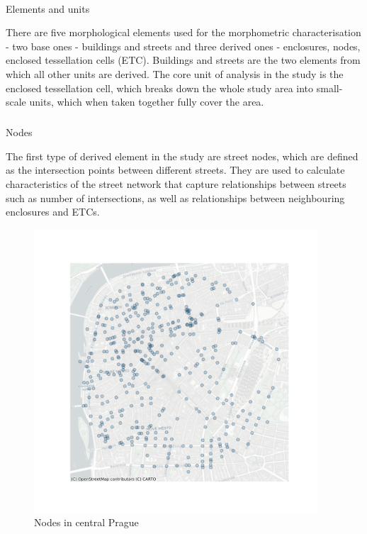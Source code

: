 \documentclass[
  letterpaper,
  DIV=11,
  numbers=noendperiod]{scrartcl}
\makeatletter
\let\oldparagraph\paragraph
\renewcommand{\paragraph}{
    \@ifstar
      \xxxParagraphStar
      \xxxParagraphNoStar
  }
\newcommand{\xxxParagraphStar}[1]{\oldparagraph*{#1}\mbox{}}
\newcommand{\xxxParagraphNoStar}[1]{\oldparagraph{#1}\mbox{}}
\let\oldsubparagraph\subparagraph
\renewcommand{\subparagraph}{
    \@ifstar
      \xxxSubParagraphStar
      \xxxSubParagraphNoStar
  }
\newcommand{\xxxSubParagraphStar}[1]{\oldsubparagraph*{#1}\mbox{}}
\newcommand{\xxxSubParagraphNoStar}[1]{\oldsubparagraph{#1}\mbox{}}
\makeatother
\begin{document}
\paragraph{Elements and units}\label{elements-and-units}

There are five morphological elements used for the morphometric
characterisation - two base ones - buildings and streets and three
derived ones - enclosures, nodes, enclosed tessellation cells (ETC).
Buildings and streets are the two elements from which all other units
are derived. The core unit of analysis in the study is the enclosed
tessellation cell, which breaks down the whole study area into
small-scale units, which when taken together fully cover the area.

\subparagraph{Nodes}\label{nodes}

The first type of derived element in the study are street nodes, which
are defined as the intersection points between different streets. They
are used to calculate characteristics of the street network that capture
relationships between streets such as number of intersections, as well
as relationships between neighbouring enclosures and ETCs.

\begin{figure}[H]

{\centering \includegraphics[width=\linewidth,height=4.16667in,keepaspectratio]{../figures/algo_design/nodes.png}

}

\caption{Nodes in central Prague}

\end{figure}%
\end{document}
